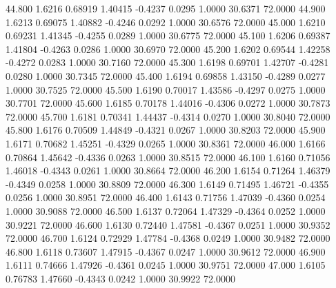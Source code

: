   44.800   1.6216   0.68919   1.40415  -0.4237   0.0295   1.0000  30.6371  72.0000
  44.900   1.6213   0.69075   1.40882  -0.4246   0.0292   1.0000  30.6576  72.0000
  45.000   1.6210   0.69231   1.41345  -0.4255   0.0289   1.0000  30.6775  72.0000
  45.100   1.6206   0.69387   1.41804  -0.4263   0.0286   1.0000  30.6970  72.0000
  45.200   1.6202   0.69544   1.42258  -0.4272   0.0283   1.0000  30.7160  72.0000
  45.300   1.6198   0.69701   1.42707  -0.4281   0.0280   1.0000  30.7345  72.0000
  45.400   1.6194   0.69858   1.43150  -0.4289   0.0277   1.0000  30.7525  72.0000
  45.500   1.6190   0.70017   1.43586  -0.4297   0.0275   1.0000  30.7701  72.0000
  45.600   1.6185   0.70178   1.44016  -0.4306   0.0272   1.0000  30.7873  72.0000
  45.700   1.6181   0.70341   1.44437  -0.4314   0.0270   1.0000  30.8040  72.0000
  45.800   1.6176   0.70509   1.44849  -0.4321   0.0267   1.0000  30.8203  72.0000
  45.900   1.6171   0.70682   1.45251  -0.4329   0.0265   1.0000  30.8361  72.0000
  46.000   1.6166   0.70864   1.45642  -0.4336   0.0263   1.0000  30.8515  72.0000
  46.100   1.6160   0.71056   1.46018  -0.4343   0.0261   1.0000  30.8664  72.0000
  46.200   1.6154   0.71264   1.46379  -0.4349   0.0258   1.0000  30.8809  72.0000
  46.300   1.6149   0.71495   1.46721  -0.4355   0.0256   1.0000  30.8951  72.0000
  46.400   1.6143   0.71756   1.47039  -0.4360   0.0254   1.0000  30.9088  72.0000
  46.500   1.6137   0.72064   1.47329  -0.4364   0.0252   1.0000  30.9221  72.0000
  46.600   1.6130   0.72440   1.47581  -0.4367   0.0251   1.0000  30.9352  72.0000
  46.700   1.6124   0.72929   1.47784  -0.4368   0.0249   1.0000  30.9482  72.0000
  46.800   1.6118   0.73607   1.47915  -0.4367   0.0247   1.0000  30.9612  72.0000
  46.900   1.6111   0.74666   1.47926  -0.4361   0.0245   1.0000  30.9751  72.0000
  47.000   1.6105   0.76783   1.47660  -0.4343   0.0242   1.0000  30.9922  72.0000
